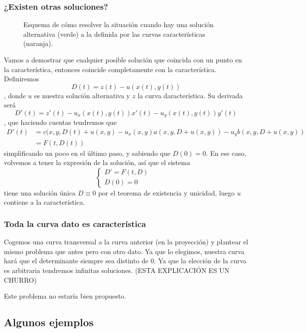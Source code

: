 \subsubsection{¿Existen otras soluciones?}

\begin{figure}[hbtp]
\centering
{}
\caption{Esquema de cómo resolver la situación cuando hay una solución alternativa (verde) a la definida por las curvas características (naranja).}
\label{fig:SolucionesAlternativasCaracteristica}
\end{figure}

Vamos a demostrar que cualquier posible solución que coincida con un punto en la característica, entonces coincide completamente con la característica. Definiremos \[ D(t) = z(t) - u(x(t), y(t))\], donde $u$ es nuestra solución alternativa y $z$ la curva daracterística. Su derivada será \[ D'(t) = z'(t) - u_x(x(t), y(t)) x'(t) - u_y(x(t), y(t)) y'(t)\], que haciendo cuentas tendremos que \begin{align*} D'(t) &= c(x, y, D(t) + u(x,y)-u_x(x,y) a(x,y, D+u(x,y)) - u_yb(x,y, D + u(x,y)) \\
&= F(t, D(t)) %
\end{align*} simplificando un poco en el último paso, y sabiendo que $D(0) = 0$. En ese caso, volvemos a tener la expresión de la solución, así que el sistema \[ \begin{cases} D'= F(t,D) & \\ D(0) = 0 & \end{cases} \] tiene una solución única $D \equiv 0$ por el teorema de existencia y unicidad, luego $u$ contiene a la característica.


\subsubsection{Toda la curva dato es característica}


Cogemos una curva transversal a la curva anterior (en la proyección) y plantear el mismo problema que antes pero con otro dato. Ya que lo elegimos, nuestra curva hará que el determinante siempre sea distinto de 0. Ya que la elección de la curva es arbitraria tendremos infinitas soluciones. (ESTA EXPLICACIÓN ES UN CHURRO)

Este problema no estaría bien propuesto.


\subsection{Algunos ejemplos}

